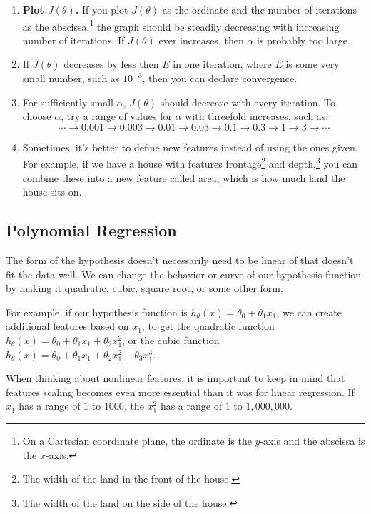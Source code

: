 \begin{enumerate}
\item \textbf{Plot \boldmath$J\left(\theta\right)$.} If you plot $J\left(\theta\right)$ as the ordinate and the number of iterations as the abscissa,\footnote{On a Cartesian coordinate plane, the ordinate is the $y$-axis and the abscissa is the $x$-axis.} the graph should be steadily decreasing with increasing number of iterations. If $J\left(\theta\right)$ ever increases, then $\alpha$ is probably too large. 
\item If $J\left(\theta\right)$ decreases by less then $E$ in one iteration, where $E$ is some very small number, such as $10^{-3}$, then you can declare convergence. 
\item For sufficiently small $\alpha$, $J\left(\theta\right)$ should decrease with every iteration. To choose $\alpha$, try a range of values for $\alpha$ with threefold increases, such as:
$$ \cdots \to 0.001 \to 0.003 \to 0.01 \to 0.03 \to 0.1 \to 0.3 \to 1 \to 3 \to \cdots$$
\item Sometimes, it's better to define new features instead of using the ones given. For example, if we have a house with features frontage\footnote{The width of the land in the front of the house.} and depth,\footnote{The width of the land on the side of the house.} you can combine these into a new feature called area, which is how much land the house sits on.
\end{enumerate}


\subsection{Polynomial Regression}
The form of the hypothesis doesn't necessarily need to be linear of that doesn't fit the data well. We can change the behavior or curve of our hypothesis function by making it quadratic, cubic, square root, or some other form. 

For example, if our hypothesis function is $h_\theta \left(x \right) = \theta_0 + \theta_1 x_1$, we can create additional features based on $x_1$, to get the quadratic function $h_\theta\left(x\right) = \theta_0 + \theta_1 x_1 + \theta_2 x_1^2$, or the cubic function $h_\theta\left(x\right) = \theta_0 + \theta_1 x_1 + \theta_2 x_1^2 + \theta_3 x_1^3$.

When thinking about nonlinear features, it is important to keep in mind that features scaling becomes even more essential than it was for linear regression. If $x_1$ has a range of $1$ to $1000$, the $x_1^2$ has a range of $1$ to $1,000,000$.



